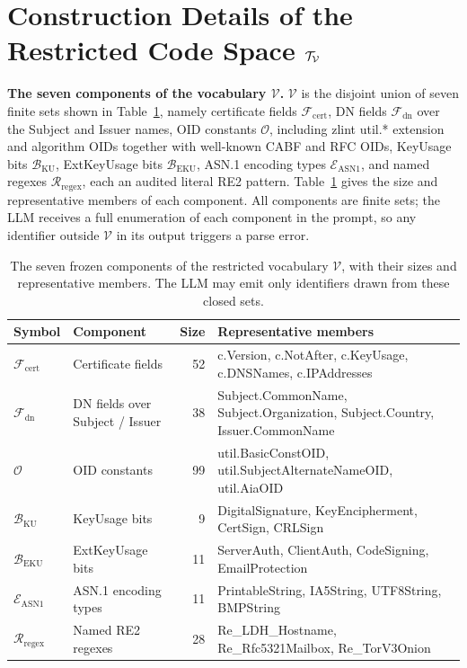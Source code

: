 \section{Construction Details of the Restricted Code Space \texorpdfstring{$\mathcal{T}_{\mathcal{V}}$}{T V}}
\label{app:tv}

\textbf{The seven components of the vocabulary $\mathcal{V}$.} $\mathcal{V}$ is
the disjoint union of seven finite sets
shown in Table~\ref{tab:vocab}, namely certificate fields $\mathcal{F}_{\mathrm{cert}}$,
DN fields $\mathcal{F}_{\mathrm{dn}}$ over the Subject and Issuer names, OID
constants $\mathcal{O}$, including zlint util.* extension and algorithm OIDs
together with well-known CABF and RFC OIDs, KeyUsage bits $\mathcal{B}_{\mathrm{KU}}$,
ExtKeyUsage bits $\mathcal{B}_{\mathrm{EKU}}$, ASN.1 encoding types
$\mathcal{E}_{\mathrm{ASN1}}$, and named regexes $\mathcal{R}_{\mathrm{regex}}$,
each an audited literal RE2 pattern. Table~\ref{tab:vocab} gives the size and
representative members of each component.
All components are finite sets; the LLM receives a full enumeration of
each component in the prompt, so any identifier outside $\mathcal{V}$ in its
output triggers a parse error.

\begin{table}[tb]
\centering
\footnotesize
\caption{The seven frozen components of the restricted vocabulary $\mathcal{V}$,
with their sizes and representative members. The LLM may emit only identifiers
drawn from these closed sets.}
\label{tab:vocab}
\begin{tabularx}{\textwidth}{@{}l l r X@{}}
\toprule
Symbol & Component & Size & Representative members \\
\midrule
$\mathcal{F}_{\mathrm{cert}}$ & Certificate fields & 52 &
  c.Version, c.NotAfter, c.KeyUsage, c.DNSNames, c.IPAddresses \\
$\mathcal{F}_{\mathrm{dn}}$ & DN fields over Subject / Issuer & 38 &
  Subject.CommonName, Subject.Organization, Subject.Country, Issuer.CommonName \\
$\mathcal{O}$ & OID constants & 99 &
  util.BasicConstOID, util.SubjectAlternateNameOID, util.AiaOID \\
$\mathcal{B}_{\mathrm{KU}}$ & KeyUsage bits & 9 &
  DigitalSignature, KeyEncipherment, CertSign, CRLSign \\
$\mathcal{B}_{\mathrm{EKU}}$ & ExtKeyUsage bits & 11 &
  ServerAuth, ClientAuth, CodeSigning, EmailProtection \\
$\mathcal{E}_{\mathrm{ASN1}}$ & ASN.1 encoding types & 11 &
  PrintableString, IA5String, UTF8String, BMPString \\
$\mathcal{R}_{\mathrm{regex}}$ & Named RE2 regexes & 28 &
  Re\_LDH\_Hostname, Re\_Rfc5321Mailbox, Re\_TorV3Onion \\
\bottomrule
\end{tabularx}
\end{table}

